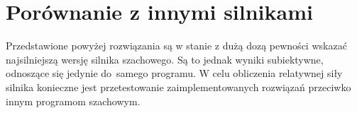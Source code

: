 \newpage
\section {Porównanie z innymi silnikami}
\label {sec: porownianie-z-silnikami}

Przedstawione powyżej rozwiązania są w stanie z dużą dozą pewności wskazać najsilniejszą wersję silnika szachowego.
Są to jednak wyniki subiektywne, odnoszące się jedynie do~samego programu.
W celu obliczenia relatywnej siły silnika konieczne jest przetestowanie zaimplementowanych rozwiązań przeciwko innym programom szachowym.


